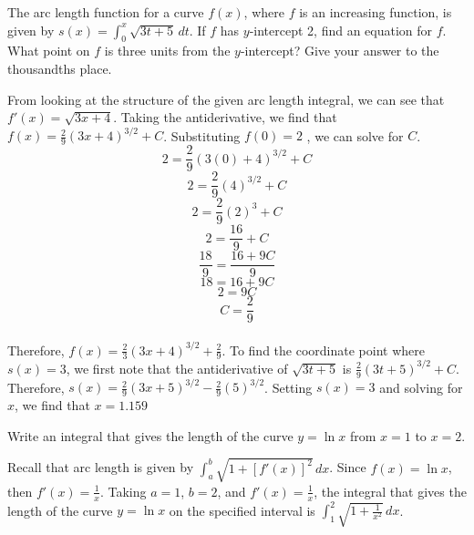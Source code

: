 \begin{Exercise}[label=length2]
The arc length function for a curve $f(x)$, where $f$ is an increasing 
function, is given by $s(x) = \int_{0}^{x} \sqrt{3t + 5}\,dt$. If $f$ 
has $y$-intercept 2, find an equation for $f$. What point on $f$ is 
three units from the $y$-intercept? Give your answer to the thousandths 
place. 
\end{Exercise}

\begin{Answer}[ref=length2]
From looking at the structure of the given arc length integral, we can 
see that $f'(x) = \sqrt{3x + 4}$. Taking the antiderivative, we find 
that $f(x) = \frac{2}{9}(3x + 4)^{3 / 2} + C$. Substituting $f(0) = 2$
, we can solve for $C$. $$2 = \frac{2}{9}(3(0) + 4)^{3 / 2} + C$$ 
$$2 = \frac{2}{9}(4)^{3 / 2} + C$$ 
$$2 = \frac{2}{9}(2)^3 + C$$ 
$$2 = \frac{16}{9} + C$$ 
$$\frac{18}{9} = \frac{16 + 9C}{9}$$ 
$$18 = 16 + 9C$$ 
$$2 = 9C$$ 
$$C = \frac{2}{9}$$\\ 
Therefore, $f(x) = \frac{2}{3}(3x + 4)^{3 / 2} + \frac{2}{9}$. To find 
the coordinate point where $s(x) = 3$, we first note that the 
antiderivative of $\sqrt{3t + 5}$ is $\frac{2}{9}(3t + 5)^{3 / 2} + C$. 
Therefore, $s(x) = \frac{2}{9}(3x + 5)^{3 / 2} - \frac{2}{9}(5)^{3 / 2}$. 
Setting $s(x) = 3$ and solving for $x$, we find that $x = 1.159$
\end{Answer}

\begin{Exercise} Write an 
	integral that gives the length of the curve $ y = \ln{x}$ from 
	$x = 1$ to $x = 2$. 
\end{Exercise}

\begin{Answer}[ref=length3]
Recall that arc length is given by $\int_a^b \sqrt{1 + [f'(x)]^2}\,dx$. 
Since $f(x) = \ln{x}$, then $f'(x) = \frac{1}{x}$. Taking $a = 1$, 
$b = 2$, and $f'(x) = \frac{1}{x}$, the integral that gives the length 
of the curve $y = \ln{x}$ on the specified interval is $\int_1^2 
\sqrt{1+\frac{1}{x^2}}\,dx$. 
\end{Answer}